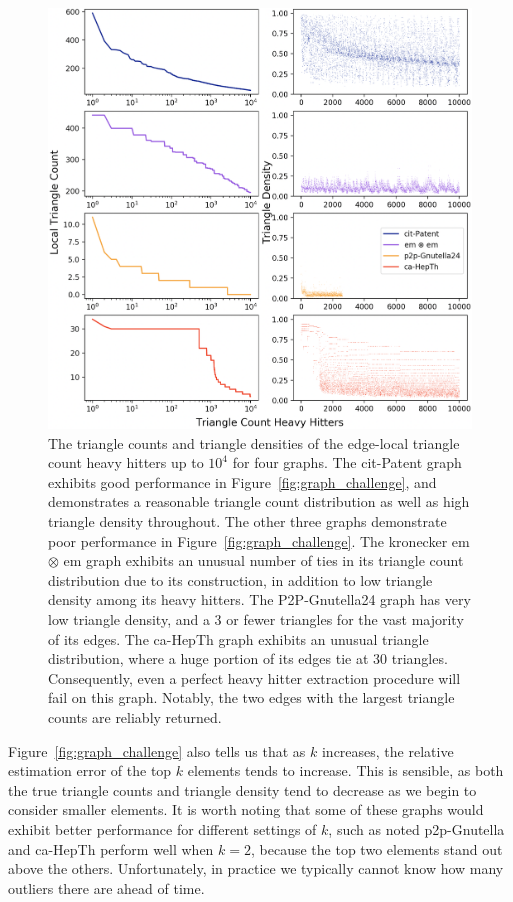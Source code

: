 \documentclass[10]{article}
\begin{document}
\begin{figure}
	\centerline{\includegraphics[width=1.0\columnwidth]{hh_comp_4}}
	\caption{The triangle counts and triangle densities of the edge-local triangle count heavy hitters up to $10^4$ for four graphs.
	The cit-Patent graph exhibits good performance in Figure~\ref{fig:graph_challenge}, and demonstrates a reasonable triangle count distribution as well as high triangle density throughout.
	The other three graphs demonstrate poor performance in Figure~\ref{fig:graph_challenge}.
	The kronecker em $\otimes$ em graph exhibits an unusual number of ties in its triangle count distribution due to its construction, in addition to low triangle density among its heavy hitters.
	The P2P-Gnutella24 graph has very low triangle density, and a 3 or fewer triangles for the vast majority of its edges.
	The ca-HepTh graph exhibits an unusual triangle distribution, where a huge portion of its edges tie at 30 triangles.
	Consequently, even a perfect heavy hitter extraction procedure will fail on this graph.
	Notably, the two edges with the largest triangle counts are reliably returned.
	\label{fig:hh_comp}}
\end{figure}

Figure~\ref{fig:graph_challenge} also tells us that as $k$ increases, the relative estimation error of the top $k$ elements tends to increase.
This is sensible, as both the true triangle counts and triangle density tend to decrease as we begin to consider smaller elements.
It is worth noting that some of these graphs would exhibit better performance for different settings of $k$, such as noted p2p-Gnutella and ca-HepTh perform well when $k=2$, because the top two elements stand out above the others.
Unfortunately, in practice we typically cannot know how many outliers there are ahead of time.
\end{document}
